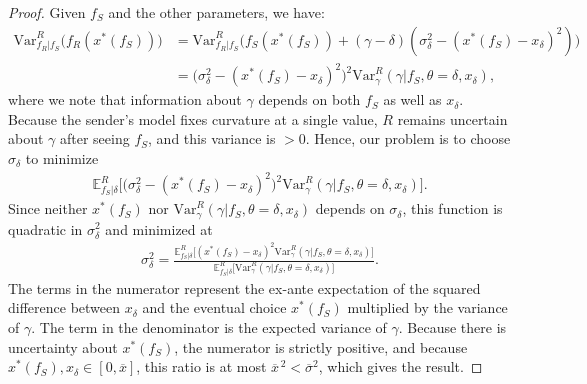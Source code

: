 \documentclass[11pt,dvipsnames]{article}
\newcommand{\Var}{\mathrm{Var}}
\begin{document}
\begin{appendix}
\forecastsimple*
\begin{proof}
Given $f_S$ and the other parameters, we have:
\begin{align*}
\Var_{f_R|f_S}^R\big(f_R(x^*(f_S))\big)
&= \Var_{f_R|f_S}^R\big(f_S(x^*(f_S))+(\gamma-\delta)(\sigma_\delta^2-(x^*(f_S)-x_\delta)^2)\big)
\\
&=\big(\sigma_\delta^2-(x^*(f_S)-x_\delta)^2\big)^2\Var_\gamma^R(\gamma|f_S,\theta=\delta,x_\delta),
\end{align*}
where we note that information about $\gamma$ depends on both $f_S$ as well as $x_\delta$.
Because the sender's model fixes curvature at a single value, $R$ remains uncertain about $\gamma$ after seeing $f_S$, and this variance is $>0$.
Hence, our problem is to choose $\sigma_\delta$ to minimize
\begin{align*}
\mathbb{E}_{f_S|\delta}^R\big[\big(\sigma_\delta^2-(x^*(f_S)-x_\delta)^2\big)^2\Var_\gamma^R(\gamma|f_S,\theta=\delta,x_\delta)\big].
\end{align*}
Since neither $x^*(f_S)$ nor $\Var_\gamma^R(\gamma|f_S,\theta=\delta,x_\delta)$ depends on $\sigma_\delta$, this function is quadratic in $\sigma_\delta^2$ and minimized at
\begin{align*}
\sigma_\delta^2 = \frac{\mathbb{E}_{f_S|\delta}^R\big[(x^*(f_S)-x_\delta)^2\Var_\gamma^R(\gamma|f_S,\theta=\delta,x_\delta)\big]}{\mathbb{E}_{f_S|\delta}^R\big[\Var_\gamma^R(\gamma|f_S,\theta=\delta,x_\delta)\big]}.
\end{align*}
The terms in the numerator represent the ex-ante expectation of the squared difference between $x_\delta$ and the eventual choice $x^*(f_S)$ multiplied by the variance of $\gamma$. The term in the denominator is the expected variance of $\gamma$.
Because there is uncertainty about $x^*(f_S)$, the numerator is strictly positive, and because $x^*(f_S),x_\delta\in[0,\overline{x}]$, this ratio is at most $\overline{x}^{\,2}<\overline{\sigma}^2$, which gives the result.
\end{proof}



\end{appendix}
\end{document}
